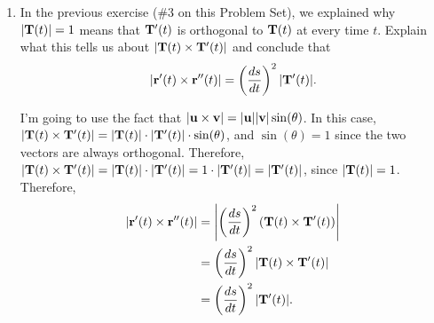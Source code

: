 \begin{enumerate}[leftmargin=0pt]
{\begin{enumerate}
        \begin{red}
            \begin{align*}
                \vr'(t) \times \vr''(t) &=
                \left[\frac{ds}{dt}\cdot \vT(t)\right]
                \times
                \left[\frac{d^2s}{dt^2} \vT(t) + \frac{ds}{dt} \vT'(t)\right]
                \intertext{$\frac{ds}{dt}$ is a scalar, so we can factor it out of the first term:}
                &= \frac{ds}{dt} \left(
                \left[\vT(t)\right]
                \times
                \left[\frac{d^2s}{dt^2} \vT(t) + \frac{ds}{dt} \vT'(t)\right]
                \right)
                \intertext{We know the cross product distributes:}
                &= \frac{ds}{dt} \left(
                \left[\vT(t) \times \frac{d^2s}{dt^2} \vT(t) \right] +
                \left[\vT(t) \times \frac{ds}{dt} \vT'(t) \right]
                \right)
                \intertext{The first cross product is $\mathbf{0}$, since $\vT(t)$ is certainly parallel to $\frac{d^2s}{dt^2} \vT(t).$ }
                &= \frac{ds}{dt} \left(\vT(t) \times \frac{ds}{dt} \vT'(t) \right)
                \intertext{We can again factor out a $\frac{ds}{dt}$, this time from the second term:}
                &= \left( \frac{ds}{dt} \right)^2 (\vT(t) \times \vT'(t))
            \end{align*}
            Yay, we have arrived at what we wanted.
        \end{red}
        \item In the previous exercise (\#3 on this Problem Set), we explained why $|\mathbf{T}(t)| = 1$ means that $\mathbf{T}'(t)$ is orthogonal to $\mathbf{T}(t)$ at every time $t$. Explain what this tells us about $|\mathbf{T}(t) \times \mathbf{T}'(t)|$ and conclude that \[\lvert \mathbf{r}'(t) \times \mathbf{r}''(t) \rvert = \left(\frac{ds}{dt}\right)^2 \lvert \mathbf{T}'(t) \rvert.\]
        
        \begin{red}
            I'm going to use the fact that $|\mathbf{u}\times\mathbf{v}| = |\mathbf{u}||\mathbf{v}|\sin(\theta)$. In this case, $|\mathbf{T}(t) \times \mathbf{T}'(t)| = |\mathbf{T}(t)| \cdot |\mathbf{T}'(t)| \cdot \sin(\theta)$, and $\sin(\theta) = 1$ since the two vectors are always orthogonal. Therefore, $|\mathbf{T}(t) \times \mathbf{T}'(t)| = |\mathbf{T}(t)| \cdot |\mathbf{T}'(t)| = 1 \cdot |\mathbf{T}'(t)| = |\mathbf{T}'(t)|$, since $|\mathbf{T}(t)| =1$.
            Therefore, 
            \begin{align*}
                |\mathbf{r}'(t) \times \mathbf{r}''(t)| &=
                \left\lvert \left( \frac{ds}{dt} \right)^2 (\mathbf{T}(t) \times \mathbf{T}'(t)) \right \rvert \\
                &= \left( \frac{ds}{dt} \right)^2 \lvert \mathbf{T}(t) \times \mathbf{T}'(t) \rvert \\
                &= \left( \frac{ds}{dt} \right)^2 |\mathbf{T}'(t)|.
            \end{align*}
        \end{red}
        

\end{enumerate}}
\end{enumerate}
